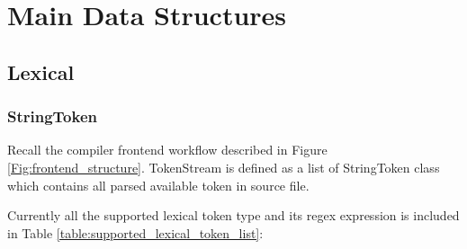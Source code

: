 \documentclass{article}
\begin{document}
\section{Main Data Structures}
    \subsection{Lexical}
        \subsubsection{StringToken }
            Recall the compiler frontend workflow described in Figure \ref{Fig:frontend_structure}. TokenStream is defined as a list of StringToken class which contains all parsed available token in source file.\par
            Currently all the supported lexical token type and its regex expression is included in Table \ref{table:supported_lexical_token_list}: \par
\end{document}
